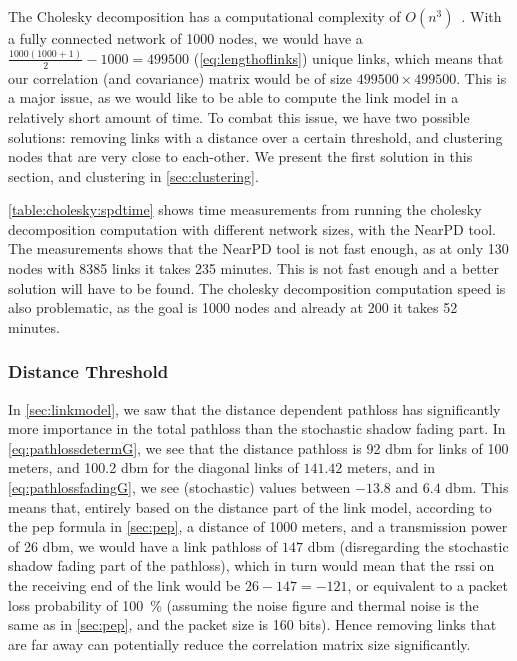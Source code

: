 The Cholesky decomposition has a computational complexity of $O(n^3)$~\cite{Press:2007:NRE:1403886}. With a fully connected network of 1000 nodes, we would have a $\frac{1000(1000+1)}{2} - 1000 = 499500$ (\autoref{eq:lengthoflinks}) unique links, which means that our correlation (and covariance) matrix would be of size $499500 \times 499500$. This is a major issue, as we would like to be able to compute the link model in a relatively short amount of time. To combat this issue, we have two possible solutions: removing links with a distance over a certain threshold, and clustering nodes that are very close to each-other. We present the first solution in this section, and clustering in \autoref{sec:clustering}.\medbreak

\autoref{table:cholesky:spdtime} shows time measurements from running the cholesky decomposition computation with different network sizes, with the NearPD tool. The measurements shows that the NearPD tool is not fast enough, as at only 130 nodes with 8385 links it takes 235 minutes. This is not fast enough and a better solution will have to be found. The cholesky decomposition computation speed is also problematic, as the goal is 1000 nodes and already at 200 it takes 52 minutes.


\subsubsection{Distance Threshold}\label{sec:distancethreshold}
In \autoref{sec:linkmodel}, we saw that the distance dependent \gls{pathloss} has significantly more importance in the total \gls{pathloss} than the stochastic shadow fading part. In \autoref{eq:pathlossdetermG}, we see that the distance \gls{pathloss} is 92 \acrshort{dbm} for links of 100 meters, and 100.2 \acrshort{dbm} for the diagonal links of $141.42$ meters, and in \autoref{eq:pathlossfadingG}, we see (stochastic) values between $-13.8$ and $6.4$ \acrshort{dbm}. This means that, entirely based on the distance part of the link model, according to the \gls{pep} formula in \autoref{sec:pep}, a distance of 1000 meters, and a transmission power of 26 \acrshort{dbm}, we would have a link \gls{pathloss} of $147$ \acrshort{dbm} (disregarding the stochastic shadow fading part of the \gls{pathloss}), which in turn would mean that the \gls{rssi} on the receiving end of the link would be $26 - 147 = -121$, or equivalent to a packet loss probability of 100~\% (assuming the noise figure and thermal noise is the same as in \autoref{sec:pep}, and the packet size is 160 bits). Hence removing links that are far away can potentially reduce the correlation matrix size significantly.

